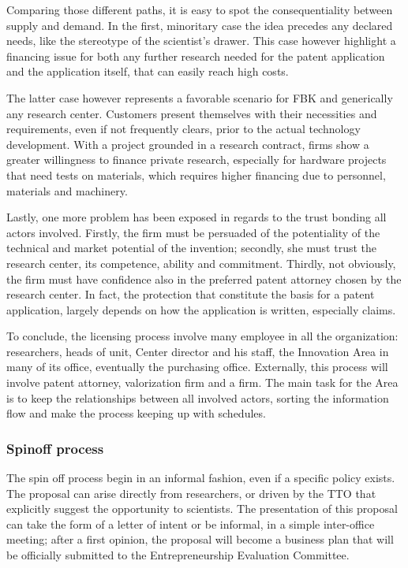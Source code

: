 Comparing those different paths, it is easy to spot the consequentiality between supply and demand. In the first, minoritary case the idea precedes any declared needs, like the stereotype of the scientist’s drawer. This case however highlight a financing issue for both any further research needed for the patent application and the application itself, that can easily reach high costs. 

The latter case however represents a favorable scenario for FBK and generically any research center. Customers present themselves with their necessities and requirements, even if not frequently clears, prior to the actual technology development. With a project grounded in a research contract, firms show a greater willingness to finance private research, especially for hardware projects that need tests on materials, which requires higher financing due to personnel, materials and machinery.

Lastly, one more problem has been exposed in regards to the trust bonding all actors involved. Firstly, the firm must be persuaded of the potentiality of the technical and market potential of the invention; secondly, she must trust the research center, its competence, ability and commitment. Thirdly, not obviously, the firm must have confidence also in the preferred patent attorney chosen by the research center. In fact, the protection that constitute the basis for a patent application, largely depends on how the application is written, especially claims.

To conclude, the licensing process involve many employee in all the organization: researchers, heads of unit, Center director and his staff, the Innovation Area in many of its office, eventually the purchasing office. Externally, this process will involve patent attorney, valorization firm and a firm. The main task for the Area is to keep the relationships between all involved actors, sorting the information flow and make the process keeping up with schedules.

\subsubsection{Spinoff process}

The spin off process begin in an informal fashion, even if a specific policy exists. The proposal can arise directly from researchers, or driven by the TTO that explicitly suggest the opportunity to scientists. The presentation of this proposal can take the form of a letter of intent or be informal, in a simple inter-office meeting; after a first opinion, the proposal will become a business plan that will be officially submitted to the Entrepreneurship Evaluation Committee. 

